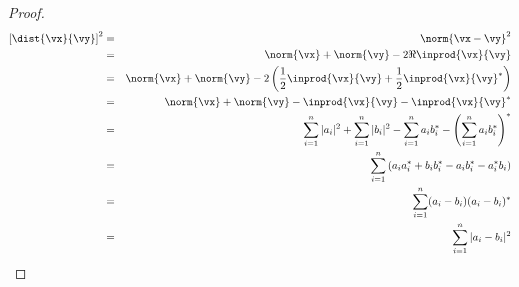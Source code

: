 \begin{proof}
\begin{eqnarray*}
   \left[ \dist{\vx}{\vy} \right]^2
     &=& \norm{\vx-\vy}^2
   \\&=& \norm{\vx} + \norm{\vy} -2\Re\inprod{\vx}{\vy}
   \\&=& \norm{\vx} + \norm{\vy} -2\left( \frac{1}{2}\inprod{\vx}{\vy} + \frac{1}{2}\inprod{\vx}{\vy}^\ast \right)
   \\&=& \norm{\vx} + \norm{\vy} -\inprod{\vx}{\vy} - \inprod{\vx}{\vy}^\ast
   \\&=& \sum_{i=1}^n |a_i|^2 + \sum_{i=1}^n |b_i|^2 -\sum_{i=1}^n a_i b_i^\ast -\left(\sum_{i=1}^n a_i b_i^\ast \right)^\ast
   \\&=& \sum_{i=1}^n \left( a_i a_i^\ast + b_i b_i^\ast - a_i b_i^\ast - a_i^\ast b_i \right)
   \\&=& \sum_{i=1}^n (a_i - b_i)(a_i - b_i)^\ast
   \\&=& \sum_{i=1}^n | a_i - b_i |^2
\end{eqnarray*}
\end{proof}



